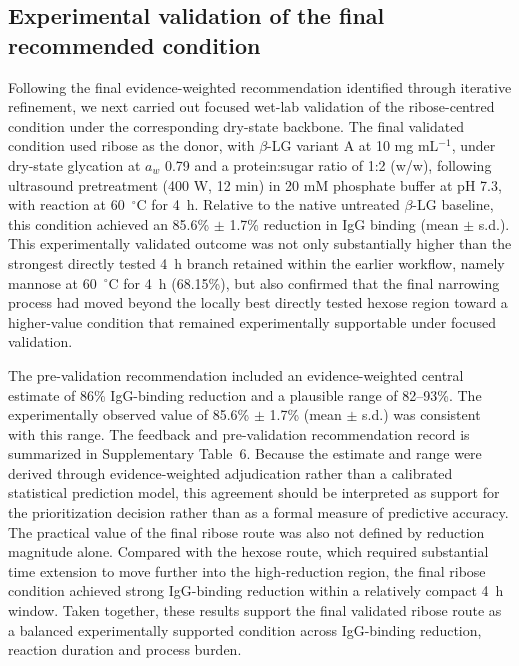 \subsection{Experimental validation of the final recommended condition}

Following the final evidence-weighted recommendation identified through iterative refinement, we next carried out focused wet-lab validation of the ribose-centred condition under the corresponding dry-state backbone. The final validated condition used ribose as the donor, with $\beta$-LG variant A at 10 mg mL$^{-1}$, under dry-state glycation at $a_w$ 0.79 and a protein:sugar ratio of 1:2 (w/w), following ultrasound pretreatment (400 W, 12 min) in 20 mM phosphate buffer at pH 7.3, with reaction at 60~$^\circ$C for 4~h. Relative to the native untreated $\beta$-LG baseline, this condition achieved an 85.6\% $\pm$ 1.7\% reduction in IgG binding (mean $\pm$ s.d.). This experimentally validated outcome was not only substantially higher than the strongest directly tested 4~h branch retained within the earlier workflow, namely mannose at 60~$^\circ$C for 4~h (68.15\%), but also confirmed that the final narrowing process had moved beyond the locally best directly tested hexose region toward a higher-value condition that remained experimentally supportable under focused validation.

The pre-validation recommendation included an evidence-weighted central estimate of 86\% IgG-binding reduction and a plausible range of 82--93\%. The experimentally observed value of 85.6\% $\pm$ 1.7\% (mean $\pm$ s.d.) was consistent with this range. The feedback and pre-validation recommendation record is summarized in Supplementary Table~6. Because the estimate and range were derived through evidence-weighted adjudication rather than a calibrated statistical prediction model, this agreement should be interpreted as support for the prioritization decision rather than as a formal measure of predictive accuracy. The practical value of the final ribose route was also not defined by reduction magnitude alone. Compared with the hexose route, which required substantial time extension to move further into the high-reduction region, the final ribose condition achieved strong IgG-binding reduction within a relatively compact 4~h window. Taken together, these results support the final validated ribose route as a balanced experimentally supported condition across IgG-binding reduction, reaction duration and process burden.

